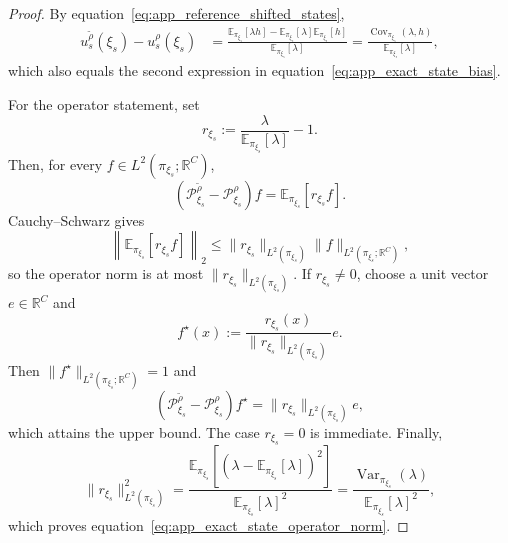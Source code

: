 \documentclass{article}
\def\eqref#1{equation~\ref{#1}}
\begin{document}
\begin{proof}
By \eqref{eq:app_reference_shifted_states},
\begin{align}
    u_s^{\widetilde{\rho}}(\xi_s)-u_s^{\rho}(\xi_s)
    &=\frac{\mathbb{E}_{\pi_{\xi_s}}[\lambda h]
    -\mathbb{E}_{\pi_{\xi_s}}[\lambda]
    \mathbb{E}_{\pi_{\xi_s}}[h]}{\mathbb{E}_{\pi_{\xi_s}}[\lambda]}
    =\frac{\operatorname{Cov}_{\pi_{\xi_s}}(\lambda,h)}{\mathbb{E}_{\pi_{\xi_s}}[\lambda]},
    \label{eq:app_state_bias_proof_cov}
\end{align}
which also equals the second expression in \eqref{eq:app_exact_state_bias}.

For the operator statement, set
\begin{equation}
    r_{\xi_s}:=\frac{\lambda}{\mathbb{E}_{\pi_{\xi_s}}[\lambda]}-1.
    \label{eq:app_centered_density_ratio}
\end{equation}
Then, for every $f\in L^2(\pi_{\xi_s};\mathbb{R}^{C})$,
\begin{equation}
    \left(\mathcal{P}_{\xi_s}^{\widetilde{\rho}}
    -\mathcal{P}_{\xi_s}^{\rho}\right)f
    =\mathbb{E}_{\pi_{\xi_s}}[r_{\xi_s}f].
    \label{eq:app_state_operator_difference}
\end{equation}
Cauchy--Schwarz gives
\begin{equation}
    \left\|\mathbb{E}_{\pi_{\xi_s}}[r_{\xi_s}f]\right\|_2
    \leq \|r_{\xi_s}\|_{L^2(\pi_{\xi_s})}
    \|f\|_{L^2(\pi_{\xi_s};\mathbb{R}^{C})},
    \label{eq:app_state_operator_upper}
\end{equation}
so the operator norm is at most $\|r_{\xi_s}\|_{L^2(\pi_{\xi_s})}$. If $r_{\xi_s}\neq0$, choose a unit vector $e\in\mathbb{R}^{C}$ and
\begin{equation}
    f^{\star}(x)
    :=\frac{r_{\xi_s}(x)}{\|r_{\xi_s}\|_{L^2(\pi_{\xi_s})}}e.
    \label{eq:app_state_operator_extremizer}
\end{equation}
Then $\|f^{\star}\|_{L^2(\pi_{\xi_s};\mathbb{R}^{C})}=1$ and
\begin{equation}
    \left(\mathcal{P}_{\xi_s}^{\widetilde{\rho}}
    -\mathcal{P}_{\xi_s}^{\rho}\right)f^{\star}
    =\|r_{\xi_s}\|_{L^2(\pi_{\xi_s})}e,
    \label{eq:app_state_operator_attainment}
\end{equation}
which attains the upper bound. The case $r_{\xi_s}=0$ is immediate. Finally,
\begin{equation}
    \|r_{\xi_s}\|_{L^2(\pi_{\xi_s})}^2
    =\frac{\mathbb{E}_{\pi_{\xi_s}}\!\left[
    (\lambda-\mathbb{E}_{\pi_{\xi_s}}[\lambda])^2\right]}{\mathbb{E}_{\pi_{\xi_s}}[\lambda]^2}
    =\frac{\operatorname{Var}_{\pi_{\xi_s}}(\lambda)}{\mathbb{E}_{\pi_{\xi_s}}[\lambda]^2},
    \label{eq:app_state_operator_variance}
\end{equation}
which proves \eqref{eq:app_exact_state_operator_norm}.
\end{proof}
\end{document}

